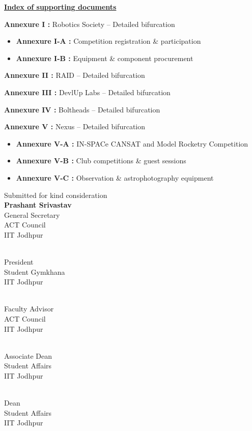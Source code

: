 \documentclass[11pt,letterpaper]{article}
\newcommand{\GSname}{Prashant Srivastav}
\newcommand{\PresName}{Rudra Gupta}
\newcommand{\FAname}{Dr. Hardik Jain}
\newcommand{\ADname}{Dr. Pranay Ranjan}
\newcommand{\Deanname}{Dr. Rajlaxmi Chouhan}
\newcommand{\signature}[3]{%
  \begin{minipage}[t]{0.45\textwidth}\raggedright
  \vspace{1.2cm}{\bfseries #1}\\ #2\\ #3\\ IIT Jodhpur\end{minipage}}
\begin{document}
\clearpage
{\large\bfseries\underline{Index of supporting documents}}\par
\setlength{\parskip}{2pt}
{\bfseries Annexure I :} Robotics Society -- Detailed bifurcation
\begin{itemize}
  \item {\bfseries Annexure I-A :} Competition registration \& participation
  \item {\bfseries Annexure I-B :} Equipment \& component procurement
\end{itemize}
{\bfseries Annexure II :} RAID -- Detailed bifurcation\par
{\bfseries Annexure III :} DevlUp Labs -- Detailed bifurcation\par
{\bfseries Annexure IV :} Boltheads -- Detailed bifurcation\par
{\bfseries Annexure V :} Nexus -- Detailed bifurcation
\begin{itemize}
  \item {\bfseries Annexure V-A :} IN-SPACe CANSAT and Model Rocketry Competition
  \item {\bfseries Annexure V-B :} Club competitions \& guest sessions
  \item {\bfseries Annexure V-C :} Observation \& astrophotography equipment
\end{itemize}
\setlength{\parskip}{6pt}

\clearpage
\begin{flushright}
  {\small Submitted for kind consideration}\\[1.2cm]
  {\large\bfseries \GSname}\\
  General Secretary\\
  ACT Council\\
  IIT Jodhpur
\end{flushright}

\noindent\signature{\PresName}{President}{Student Gymkhana}\par
\noindent\signature{\FAname}{Faculty Advisor}{ACT Council}\par
\noindent\signature{\ADname}{Associate Dean}{Student Affairs}\par
\noindent\signature{\Deanname}{Dean}{Student Affairs}
\end{document}
